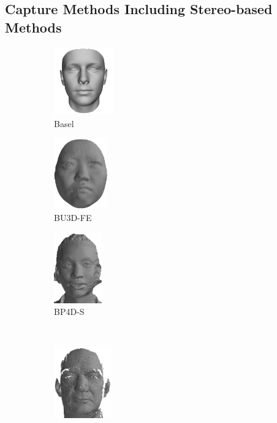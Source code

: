 \subsection{Capture Methods Including Stereo-based Methods}\label{subsec:bg_capture}
\begin{figure}[ht]
	\centering
	\begin{subfigure}[b]{0.3\textwidth}
		\centering
		\includegraphics[height=1.15in]{background/images/basel}
		\caption{Basel~\cite{paysan20093d}}\label{fig:db_examples_basel}
	\end{subfigure}
	\begin{subfigure}[b]{0.3\textwidth}
		\centering
		\includegraphics[height=1.2in]{background/images/bu3d}
		\caption{BU3D-FE~\cite{Yin:2006cc}}\label{fig:db_examples_bu3d}
	\end{subfigure}
	\begin{subfigure}[b]{0.3\textwidth}
		\centering
		\includegraphics[height=1.2in]{background/images/bp4d}
		\caption{BP4D-S~\cite{Zhang:2014id}}\label{fig:db_examples_bp4d}
	\end{subfigure} \\
	\begin{subfigure}[b]{0.3\textwidth}
		\centering
		\includegraphics[height=1.2in]{background/images/frgc}

\end{subfigure}
\end{figure}
